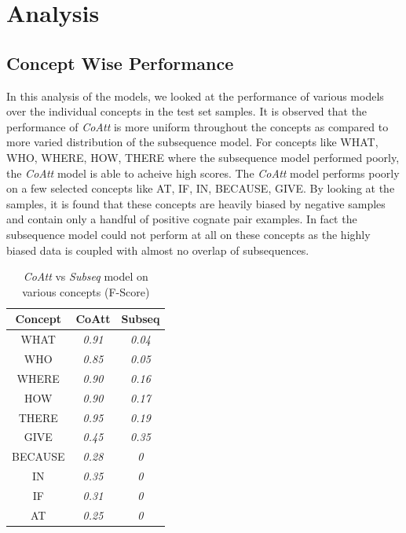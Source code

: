 \documentclass[11pt,letterpaper]{article}
\begin{document}
\section{Analysis}

\subsection{Concept Wise Performance}

In this analysis of the models, we looked at the performance of various models over the individual concepts in the test set samples. It is observed that the performance of \textit{CoAtt} is more uniform throughout the concepts as compared to more varied distribution of the subsequence model. For concepts like WHAT, WHO, WHERE, HOW, THERE where the subsequence model performed poorly, the \textit{CoAtt} model is able to acheive high scores. The \textit{CoAtt} model performs poorly on a few selected concepts like AT, IF, IN, BECAUSE, GIVE. By looking at the samples, it is found that these concepts are heavily biased by negative samples and contain only a handful of positive cognate pair examples. In fact the subsequence model could not perform at all on these concepts as the highly biased data is coupled with almost no overlap of subsequences.

\begin{table}[h]
\centering
\begin{tabular}{ccc}
\textbf{Concept} & \textbf{CoAtt} & \textbf{Subseq} \\ \hline
WHAT             & \textit{0.91}  & \textit{0.04}   \\
WHO              & \textit{0.85}  & \textit{0.05}   \\
WHERE            & \textit{0.90}  & \textit{0.16}   \\
HOW              & \textit{0.90}  & \textit{0.17}   \\
THERE            & \textit{0.95}  & \textit{0.19}  \\
GIVE             & \textit{0.45}  & \textit{0.35}  \\
BECAUSE          & \textit{0.28}  & \textit{0}      \\
IN               & \textit{0.35}  & \textit{0}      \\
IF               & \textit{0.31}  & \textit{0}      \\
AT               & \textit{0.25}  & \textit{0}      
\end{tabular}
\caption{\textit{CoAtt} vs \textit{Subseq} model on various concepts (F-Score)}
\end{table}
\end{document}
